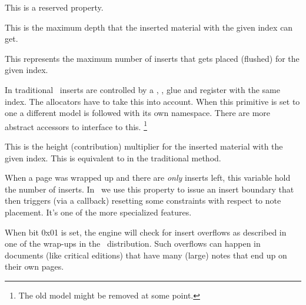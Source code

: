 This is a reserved property.

\stopnewprimitive

\startnewprimitive[title={\prm {insertmaxdepth}}]

This is the maximum depth that the inserted material with the given index can
get.

\stopnewprimitive

\startnewprimitive[title={\prm {insertmaxplaced}}]

This represents the maximum number of inserts that gets placed (flushed) for the
given index.

\stopnewprimitive

\startnewprimitive[title={\prm {insertmode}}]

In traditional \TEX\ inserts are controlled by a , , \prm
{glue} and  register with the same index. The allocators have to take
this into account. When this primitive is set to one a different model is
followed with its own namespace. There are more abstract accessors to interface
to this. \footnote {The old model might be removed at some point.}

\stopnewprimitive

\startnewprimitive[title={\prm {insertmultiplier}}]

This is the height (contribution) multiplier for the inserted material with the
given index. This is equivalent to  in the traditional method.

\stopnewprimitive

\startnewprimitive[title={\prm {insertonlycount}}]

When a page was wrapped up and there are {\em only} inserts left, this variable
hold the number of inserts. In \CONTEXT\ we use this property to issue an insert
boundary that then triggers (via a callback) resetting some constraints with
respect to note placement. It's one of the more specialized features.

\stopnewprimitive

\startnewprimitive[title={\prm {insertoptions}}]

When bit 0x01 is set, the engine will check for insert overflows as described in
one of the  wrap-ups in the \CONTEXT\ distribution. Such overflows
can happen in documents (like critical editions) that have many (large) notes
that end up on their own pages.

\stopnewprimitive

\startoldprimitive[title={\prm {insertpenalties}}]

